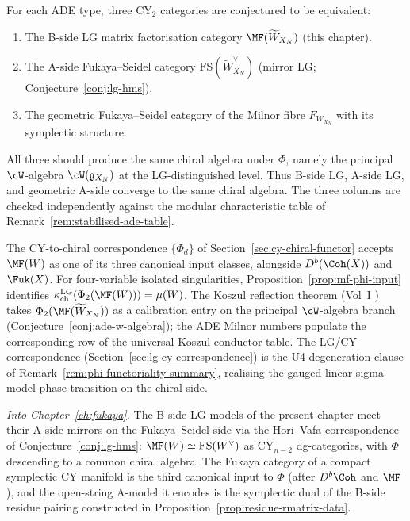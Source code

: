 \begin{remark}
\label{rem:ade-three-sides}
For each ADE type, three CY$_2$ categories are conjectured to be equivalent:
\begin{enumerate}
 \item The B-side LG matrix factorisation category $\MF(\widetilde{W}_{X_N})$ (this chapter).
 \item The A-side Fukaya--Seidel category $\mathrm{FS}(\widetilde{W}_{X_N}^\vee)$ (mirror LG; Conjecture~\ref{conj:lg-hms}).
 \item The geometric Fukaya--Seidel category of the Milnor fibre $F_{W_{X_N}}$ with its symplectic structure.
\end{enumerate}
All three should produce the same chiral algebra under $\Phi$, namely the principal $\cW$-algebra $\cW(\mathfrak{g}_{X_N})$ at the LG-distinguished level. Thus B-side LG, A-side LG, and geometric A-side converge to the same chiral algebra. The three columns are checked independently against the modular characteristic table of Remark~\ref{rem:stabilised-ade-table}.
\end{remark}

\begin{remark}
\label{rem:mf-cross-chapter}
The CY-to-chiral correspondence $\{\Phi_d\}$ of Section~\ref{sec:cy-chiral-functor} accepts $\MF(W)$ as one of its three canonical input classes, alongside $D^b(\Coh(X))$ and $\Fuk(X)$. For four-variable isolated singularities, Proposition~\ref{prop:mf-phi-input} identifies $\kappa_{\mathrm{ch}}^{\mathrm{LG}}(\Phi_2(\MF(W))) = \mu(W)$. The Koszul reflection theorem (Vol~I \cite{VolI}) takes $\Phi_2(\MF(\widetilde{W}_{X_N}))$ as a calibration entry on the principal $\cW$-algebra branch (Conjecture~\ref{conj:ade-w-algebra}); the ADE Milnor numbers populate the corresponding row of the universal Koszul-conductor table. The LG/CY correspondence (Section~\ref{sec:lg-cy-correspondence}) is the U4 degeneration clause of Remark~\ref{rem:phi-functoriality-summary}, realising the gauged-linear-sigma-model phase transition on the chiral side.
\end{remark}

\smallskip
\noindent\textit{Into Chapter~\ref{ch:fukaya}.} The B-side LG models of the present chapter meet their A-side mirrors on the Fukaya--Seidel side via the Hori--Vafa correspondence of Conjecture~\ref{conj:lg-hms}: $\MF(W) \simeq \mathrm{FS}(W^\vee)$ as CY$_{n-2}$ dg-categories, with $\Phi$ descending to a common chiral algebra. The Fukaya category of a compact symplectic CY manifold is the third canonical input to $\Phi$ (after $D^b\Coh$ and $\MF$), and the open-string A-model it encodes is the symplectic dual of the B-side residue pairing constructed in Proposition~\ref{prop:residue-rmatrix-data}.

